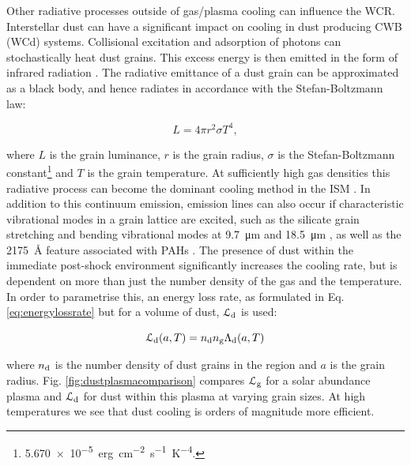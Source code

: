 Other radiative processes outside of gas/plasma cooling can influence the WCR.
Interstellar dust can have a significant impact on cooling in dust producing CWB (WCd) systems.
Collisional excitation and adsorption of photons can stochastically heat dust grains.
This excess energy is then emitted in the form of infrared radiation \parencite{dwekCoolingSputteringInfrared1996}.
The radiative emittance of a dust grain can be approximated as a black body, and hence radiates in accordance with the Stefan-Boltzmann law:

\begin{equation}
  L = 4\pi r^2 \sigma T^4 , 
\end{equation}

\noindent
where $L$ is the grain luminance, $r$ is the grain radius, $\sigma$ is the Stefan-Boltzmann constant\footnote{\SI{5.670e-5}{erg.cm^{-2}.s^{-1}.K^{-4}}.} and $T$ is the grain temperature.
At sufficiently high gas densities this radiative process can become the dominant cooling method in the ISM \parencite{wolfireNeutralAtomicPhases1995}.
In addition to this continuum emission, emission lines can also occur if characteristic vibrational modes in a grain lattice are excited, such as the silicate grain stretching and bending vibrational modes at \SI{9.7}{\micro\metre} and \SI{18.5}{\micro\metre} \parencite[212]{whittetDustGalacticEnvironment2002}, as well as the \SI{2175}{\angstrom} feature associated with PAHs \parencite{draineInterstellarDustGrains2003}.
The presence of dust within the immediate post-shock environment significantly increases the cooling rate, but is dependent on more than just the number density of the gas and the temperature.
In order to parametrise this, an energy loss rate, as formulated in Eq. \ref{eq:energylossrate} but for a volume of dust, $\mathcal{L}_\text{d}$ is used:

\begin{equation}
  \mathcal{L}_\text{d} (a,T) = n_\text{d} n_\text{g} \Lambda_\text{d} (a,T)
\end{equation}

\noindent
where $n_\text{d}$ is the number density of dust grains in the region and $a$ is the grain radius.
Fig. \ref{fig:dustplasmacomparison} compares $\mathcal{L}_\text{g}$ for a solar abundance plasma and $\mathcal{L}_\text{d}$ for dust within this plasma at varying grain sizes.
At high temperatures we see that dust cooling is orders of magnitude more efficient.

